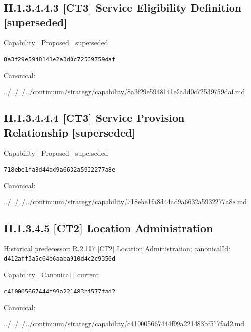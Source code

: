 \documentclass[10pt,a4paper]{article}
\begin{document}
\subsection*{II.1.3.4.4.3 [CT3] Service Eligibility Definition [superseded]}
\label{element-8a3f29e5948141e2a3d0c72539759daf}
{\small Capability | Proposed | superseded}\par
\texttt{8a3f29e5948141e2a3d0c72539759daf}\par
Canonical: \par
{\footnotesize\url{../../../../continuum/strategy/capability/8a3f29e5948141e2a3d0c72539759daf.md}}\par
\subsection*{II.1.3.4.4.4 [CT3] Service Provision Relationship [superseded]}
\label{element-718ebe1fa8d44ad9a6632a5932277a8e}
{\small Capability | Proposed | superseded}\par
\texttt{718ebe1fa8d44ad9a6632a5932277a8e}\par
Canonical: \par
{\footnotesize\url{../../../../continuum/strategy/capability/718ebe1fa8d44ad9a6632a5932277a8e.md}}\par
\subsection*{II.1.3.4.5 [CT2] Location Administration}
Historical predecessor: \hyperref[element-d412aff3a5c64e6aaba910d4c2c9356d]{R.2.107 [CT2] Location Administration}; canonicalId: \texttt{d412aff3a5c64e6aaba910d4c2c9356d}\par
\label{element-c410005667444f99a221483bf577fad2}
{\small Capability | Canonical | current}\par
\texttt{c410005667444f99a221483bf577fad2}\par
Canonical: \par
{\footnotesize\url{../../../../continuum/strategy/capability/c410005667444f99a221483bf577fad2.md}}\par
\end{document}
